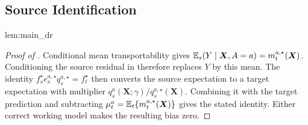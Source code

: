 \documentclass[12pt]{article}
\begin{document}
\subsection{Source Identification}\label{supp:pairwise_identification}
\begin{restatedmain}{lem:main_dr}
\FACEHDSourceIdentification
\end{restatedmain}
\label{proof:main_dr}
\begin{proof}[Proof of ]
Conditional mean transportability gives $\mathbb{E}_s(Y\mid\boldsymbol X,A=a)=m_t^{a,\star}(\boldsymbol X)$. Conditioning the source residual in  therefore replaces $Y$ by this mean. The identity $f_s^\star e_s^{a,\star}q_s^{a,\star}=f_t^\star$ then converts the source expectation to a target expectation with multiplier $q_s^a(\boldsymbol X;\gamma)/q_s^{a,\star}(\boldsymbol X)$. Combining it with the target prediction and subtracting $\mu_t^a=\mathbb{E}_t\{m_t^{a,\star}(\boldsymbol X)\}$ gives the stated identity. Either correct working model makes the resulting bias zero.
\end{proof}

\end{document}
